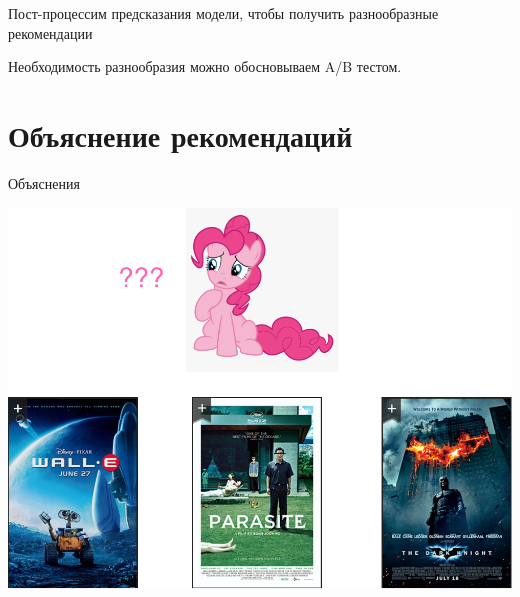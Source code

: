 \documentclass[11pt,aspectratio=169]{beamer}
\begin{document}
\begin{frame}{}

\begin{tcolorbox}[colback=info!5,colframe=info!80,title=]
Пост-процессим предсказания модели, чтобы получить разнообразные рекомендации
\end{tcolorbox}

\begin{tcolorbox}[colback=info!5,colframe=info!80,title=]
Необходимость разнообразия можно обосновываем A/B тестом.
\end{tcolorbox}

\end{frame}

\section{Объяснение рекомендаций}

\begin{frame}{Объяснения}

\begin{center}
\includegraphics[scale=0.22]{images/explainability-1.png}
\end{center}

\end{frame}
\end{document}

